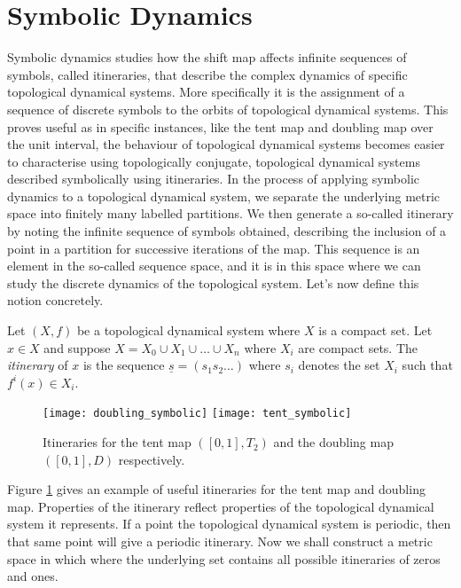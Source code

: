 \section{Symbolic Dynamics} \label{sec:symbolic-dynamics}
Symbolic dynamics studies how the shift map affects infinite sequences of symbols, called itineraries, that describe the complex dynamics of specific topological dynamical systems. More specifically it is the assignment of a sequence of discrete symbols to the orbits of topological dynamical systems. This proves useful as in specific instances, like the tent map and doubling map over the unit interval, the behaviour of topological dynamical systems becomes easier to characterise using topologically conjugate, topological dynamical systems described symbolically using itineraries. In the process of applying symbolic dynamics to a topological dynamical system, we separate the underlying metric space into finitely many labelled partitions. We then generate a so-called itinerary by noting the infinite sequence of symbols obtained, describing the inclusion of a point in a partition for successive iterations of the map. This sequence is an element in the so-called sequence space, and it is in this space where we can study the discrete dynamics of the topological system. Let's now define this notion concretely.

\begin{defn}[Itinerary] \label{defn:itinerary}
    Let $(X, f)$ be a topological dynamical system where $X$ is a compact set. Let $x \in X$ and suppose $X = X_0 \cup X_1 \cup \dots \cup X_n$ where $X_i$ are compact sets. The \emph{itinerary} of $x$ is the sequence $\underline{s} = (s_1s_2\dots)$ where $s_i$ denotes the set $X_i$ such that $f^i(x) \in X_i$.
\end{defn}

\begin{figure}[h]
    \centering
    \texttt{[image: doubling\_symbolic]}
    \texttt{[image: tent\_symbolic]}
    \caption{Itineraries for the tent map $([0, 1], T_2)$ and the doubling map $([0, 1], D)$ respectively.}
    \label{fig:symbolic}
\end{figure}

Figure \ref{fig:symbolic} gives an example of useful itineraries for the tent map and doubling map. Properties of the itinerary reflect properties of the topological dynamical system it represents. If a point the topological dynamical system is periodic, then that same point will give a periodic itinerary. Now we shall construct a metric space in which where the underlying set contains all possible itineraries of zeros and ones.

